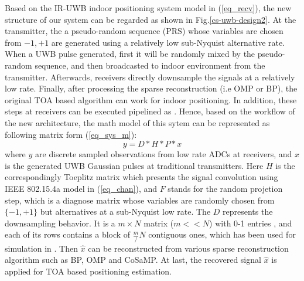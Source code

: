 Based on the IR-UWB indoor positioning system model in (\ref{eq_recv}), the new structure of our system can be regarded as shown in Fig.\ref{cs-uwb-design2}. At the transmitter, the a pseudo-random sequence (PRS) whose variables are chosen from ${-1,+1}$ are generated using a relatively low sub-Nyquist alternative rate. When a UWB pulse generated, first it will be randomly mixed by the pseudo-random sequence, and then broadcasted to indoor environment from the transmitter. Afterwards, receivers directly downsample the signals at a relatively low rate. Finally, after processing the sparse reconstruction (i.e OMP or BP), the original TOA based algorithm can work for indoor positioning. In addition, these steps at receivers can be executed pipelined as \cite{yang2011compressive}. Hence, based on the workflow of the new architecture, the math model of this sytem can be represented as following matrix form (\ref{eq_sys_m}):
\begin{equation}
\label{eq_sys_m}
y = D * H * P * x
\end{equation}
where $y$ are discrete sampled observations from low rate ADCs at receivers, and $x$ is the generated UWB Gaussian pulses at traditional transmitters. Here $H$ is the correspondingly Toeplitz matrix which presents the signal convolution using IEEE 802.15.4a model in (\ref{eq_chan}), and $F$ stands for the random projetion step, which is a diagnose matrix whose variables are randomly chosen from $\{-1,+1\}$ but alternatives at a sub-Nyquist low rate. The $D$ represents the downsampling behavior. It is a $m\times N$ matrix ($m << N$) with 0-1 entries , and each of its rows contains a block of $\frac{m}/{N}$ contiguous ones, which has been used for simulation in \cite{tropp2010beyond}. Then $\hat x$ can be reconstructed from various sparse reconstruction algorithm such as BP, OMP and CoSaMP. At last, the recovered signal $\hat x$ is applied for TOA based positioning estimation.
